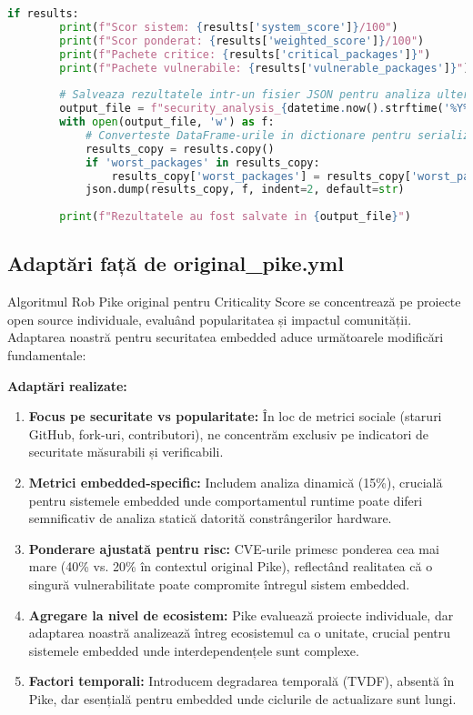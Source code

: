 \documentclass[12pt,a4paper]{article}
\begin{document}
\begin{lstlisting}[language=Python, caption=Script pentru calcularea scorului de securitate, label=lst:security_calculator]
    if results:
        print(f"Scor sistem: {results['system_score']}/100")
        print(f"Scor ponderat: {results['weighted_score']}/100")
        print(f"Pachete critice: {results['critical_packages']}")
        print(f"Pachete vulnerabile: {results['vulnerable_packages']}")
        
        # Salveaza rezultatele intr-un fisier JSON pentru analiza ulterioara
        output_file = f"security_analysis_{datetime.now().strftime('%Y%m%d_%H%M%S')}.json"
        with open(output_file, 'w') as f:
            # Converteste DataFrame-urile in dictionare pentru serializare JSON
            results_copy = results.copy()
            if 'worst_packages' in results_copy:
                results_copy['worst_packages'] = results_copy['worst_packages'].to_dict('records')
            json.dump(results_copy, f, indent=2, default=str)
        
        print(f"Rezultatele au fost salvate in {output_file}")
\end{lstlisting}

\subsection{Adaptări față de original\_pike.yml}

Algoritmul Rob Pike original pentru Criticality Score se concentrează pe proiecte open source individuale, evaluând popularitatea și impactul comunității. Adaptarea noastră pentru securitatea embedded aduce următoarele modificări fundamentale:

\textbf{Adaptări realizate:}

\begin{enumerate}
\item \textbf{Focus pe securitate vs popularitate:} În loc de metrici sociale (staruri GitHub, fork-uri, contributori), ne concentrăm exclusiv pe indicatori de securitate măsurabili și verificabili.

\item \textbf{Metrici embedded-specific:} Includem analiza dinamică (15\%), crucială pentru sistemele embedded unde comportamentul runtime poate diferi semnificativ de analiza statică datorită constrângerilor hardware.

\item \textbf{Ponderare ajustată pentru risc:} CVE-urile primesc ponderea cea mai mare (40\% vs. 20\% în contextul original Pike), reflectând realitatea că o singură vulnerabilitate poate compromite întregul sistem embedded.

\item \textbf{Agregare la nivel de ecosistem:} Pike evaluează proiecte individuale, dar adaptarea noastră analizează întreg ecosistemul ca o unitate, crucial pentru sistemele embedded unde interdependențele sunt complexe.

\item \textbf{Factori temporali:} Introducem degradarea temporală (TVDF), absentă în Pike, dar esențială pentru embedded unde ciclurile de actualizare sunt lungi.
\end{enumerate}
\end{document}
